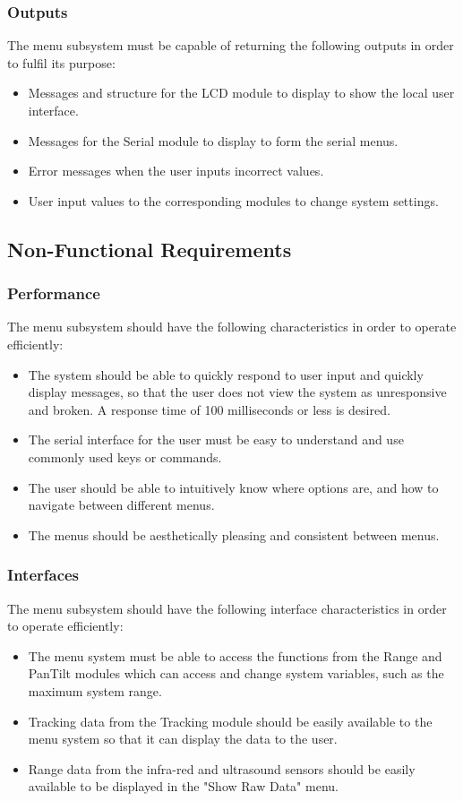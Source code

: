 \documentclass[]{report}
\begin{document}
\subsubsection{Outputs}
The menu subsystem must be capable of returning the following outputs in order to fulfil its purpose:
\begin{itemize}
	\item Messages and structure for the LCD module to display to show the local user interface.
	\item Messages for the Serial module to display to form the serial menus.
	\item Error messages when the user inputs incorrect values.
	\item User input values to the corresponding modules to change system settings.
\end{itemize}

\subsection{Non-Functional Requirements}
\subsubsection{Performance}
The menu subsystem should have the following characteristics in order to operate efficiently:
\begin{itemize}
	\item The system should be able to quickly respond to user input and quickly display messages, so that the user does not view the system as unresponsive and broken. A response time of 100 milliseconds or less is desired.
	\item The serial interface for the user must be easy to understand and use commonly used keys or commands.
	\item The user should be able to intuitively know where options are, and how to navigate between different menus.
	\item The menus should be aesthetically pleasing and consistent between menus.
\end{itemize}

\subsubsection{Interfaces}
The menu subsystem should have the following interface characteristics in order to operate efficiently:
\begin{itemize}
	\item The menu system must be able to access the functions from the Range and PanTilt modules which can access and change system variables, such as the maximum system range.
	\item Tracking data from the Tracking module should be easily available to the menu system so that it can display the data to the user.
	\item Range data from the infra-red and ultrasound sensors should be easily available to be displayed in the "Show Raw Data" menu.
\end{itemize}
\end{document}
